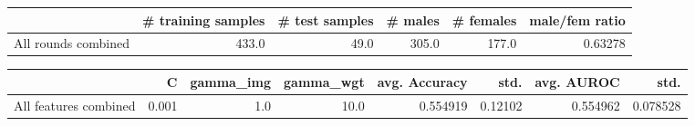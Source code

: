 \begin{tabular}{lrrrrr}
\hline
{} &  \# training samples &  \# test samples &  \# males &  \# females &  male/fem ratio \\
\hline
All rounds combined &               433.0 &            49.0 &    305.0 &      177.0 &         0.63278 \\
\hline
\end{tabular}
\begin{tabular}{lrrrrrrr}
\hline
{} &      C &  gamma\_img &  gamma\_wgt &  avg. Accuracy &     std. &  avg. AUROC &      std. \\
\hline
All features combined &  0.001 &        1.0 &       10.0 &       0.554919 &  0.12102 &    0.554962 &  0.078528 \\
\hline
\end{tabular}

